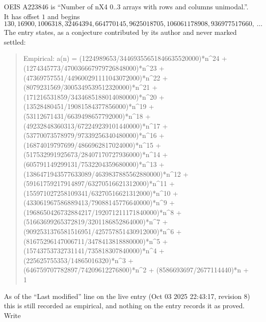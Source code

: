 \documentclass[11pt,a4paper]{article}
\theoremstyle{plain}
\theoremstyle{definition}
\begin{document}
OEIS A223846 is ``Number of nX4 0..3 arrays with rows and columns unimodal.''. It has offset $1$ and begins
\[
130, 16900, 1006318, 32464394, 664770145, 9625018705, 106061178908, 936977517660,\ \dots
\]
The entry states, as a conjecture contributed by its author and never marked settled:
\begin{quote}\raggedright\small
Empirical: a(n) = (1224989653/34469355651846635520000)*n\^{}24 + (1274345773/470036667979726848000)*n\^{}23 + (47369757551/449600291111043072000)*n\^{}22 + (8079231569/3005349539512320000)*n\^{}21 + (171216531859/3434685188014080000)*n\^{}20 + (13528480451/19081584377856000)*n\^{}19 + (53112671431/6639498657792000)*n\^{}18 + (49232848360313/672249239101440000)*n\^{}17 + (53770073578979/97339256340480000)*n\^{}16 + (16874019797699/4866962817024000)*n\^{}15 + (517532991925673/28407170727936000)*n\^{}14 + (605791149299131/7532204359680000)*n\^{}13 + (1386471943577633089/4639837885562880000)*n\^{}12 + (59161759217914897/63270516621312000)*n\^{}11 + (155971027258109341/63270516621312000)*n\^{}10 + (433061967586889413/79088145776640000)*n\^{}9 + (1968650426732884217/192071211171840000)*n\^{}8 + (51663699265372819/3201186852864000)*n\^{}7 + (9092531376581516951/425757851430912000)*n\^{}6 + (81675296147006711/3478413818880000)*n\^{}5 + (15743753732731141/735818307840000)*n\^{}4 + (225625755353/14865016320)*n\^{}3 + (646759707782897/74209612276800)*n\^{}2 + (8586693697/2677114440)*n + 1
\end{quote}
As of the ``Last modified'' line on the live entry (Oct 03 2025 22:43:17, revision 8) this is still
recorded as empirical, and nothing on the entry records it as proved. Write
\end{document}

